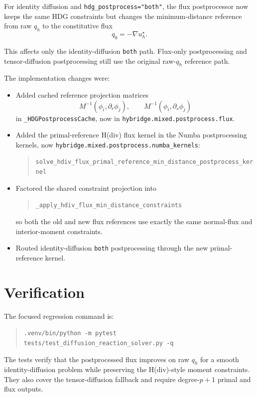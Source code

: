 \documentclass[11pt]{article}
\begin{document}
For identity diffusion and \verb|hdg_postprocess="both"|, the flux
postprocessor now keeps the same HDG constraints but changes the
minimum-distance reference from raw $q_h$ to the constitutive flux
\[
q_0 = -\nabla u_h^\star.
\]

This affects only the identity-diffusion \verb|both| path. Flux-only
postprocessing and tensor-diffusion postprocessing still use the original
raw-$q_h$ reference path.

The implementation changes were:
\begin{itemize}
    \item Added cached reference projection matrices
    \[
    M^{-1}(\phi_i, \partial_r \phi_j), \qquad
    M^{-1}(\phi_i, \partial_s \phi_j)
    \]
    in \verb|_HDGPostprocessCache|, now in \verb|hybridge.mixed.postprocess.flux|.
    \item Added the primal-reference H(div) flux kernel in
    the Numba postprocessing kernels, now \verb|hybridge.mixed.postprocess.numba_kernels|:
    \begin{quote}
    \small
    \verb|solve_hdiv_flux_primal_reference_min_distance_postprocess_kernel|
    \end{quote}
    \item Factored the shared constraint projection into
    \begin{quote}
    \small
    \verb|_apply_hdiv_flux_min_distance_constraints|
    \end{quote}
    so both the old and new
    flux references use exactly the same normal-flux and interior-moment
    constraints.
    \item Routed identity-diffusion \verb|both| postprocessing through the new
    primal-reference kernel.
\end{itemize}

\section{Verification}

The focused regression command is:
\begin{quote}
\verb|.venv/bin/python -m pytest tests/test_diffusion_reaction_solver.py -q|
\end{quote}
The tests verify that the postprocessed flux improves on raw $q_h$ for a smooth
identity-diffusion problem while preserving the H(div)-style moment
constraints. They also cover the tensor-diffusion fallback and require
degree-$p+1$ primal and flux outputs.
\end{document}
